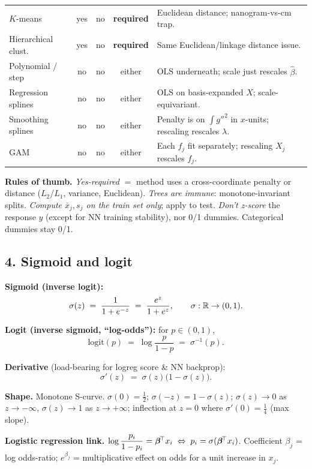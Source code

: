 \begin{tabularx}{\linewidth}{@{}l c c c X@{}}
$K$-means             & yes & no  & \textbf{required} & Euclidean distance; nanogram-vs-cm trap. \\
Hierarchical clust.   & yes & no  & \textbf{required} & Same Euclidean/linkage distance issue. \\
Polynomial / step     & no  & no  & either & OLS underneath; scale just rescales $\hat\beta$. \\
Regression splines    & no  & no  & either & OLS on basis-expanded $X$; scale-equivariant. \\
Smoothing splines     & no  & no  & either & Penalty is on $\int g''^2$ in $x$-units; rescaling rescales $\lambda$. \\
GAM                   & no  & no  & either & Each $f_j$ fit separately; rescaling $X_j$ rescales $f_j$. \\
\bottomrule
\end{tabularx}

\footnotesize

\textbf{Rules of thumb.}\quad
\emph{Yes-required} $=$ method uses a cross-coordinate penalty or distance ($L_2$/$L_1$, variance, Euclidean).
\emph{Trees are immune}: monotone-invariant splits.
\emph{Compute $\bar x_j, s_j$ on the train set only}; apply to test.
\emph{Don't z-score} the response $y$ (except for NN training stability), nor 0/1 dummies.
Categorical dummies stay 0/1.


\subsection*{4. Sigmoid and logit}

\textbf{Sigmoid (inverse logit):}
$$\sigma(z) \;=\; \frac{1}{1+e^{-z}} \;=\; \frac{e^{z}}{1+e^{z}}, \qquad \sigma:\mathbb{R}\to(0,1).$$

\textbf{Logit (inverse sigmoid, ``log-odds''):} for $p\in(0,1)$,
$$\mathrm{logit}(p) \;=\; \log\!\frac{p}{1-p} \;=\; \sigma^{-1}(p).$$

\textbf{Derivative} (load-bearing for logreg score \& NN backprop):
$$\sigma'(z) \;=\; \sigma(z)\bigl(1-\sigma(z)\bigr).$$

\textbf{Shape.} Monotone S-curve. $\sigma(0)=\tfrac12$; $\sigma(-z)=1-\sigma(z)$;
$\sigma(z)\to 0$ as $z\to-\infty$, $\sigma(z)\to 1$ as $z\to+\infty$;
inflection at $z{=}0$ where $\sigma'(0)=\tfrac14$ (max slope).

\textbf{Logistic regression link.} $\log\dfrac{p_i}{1-p_i}=\bm{\beta}^{\!\top} x_i \;\Leftrightarrow\; p_i=\sigma(\bm{\beta}^{\!\top} x_i)$. Coefficient $\beta_j$ = log odds-ratio; $e^{\beta_j}$ = multiplicative effect on odds for a unit increase in $x_j$.
